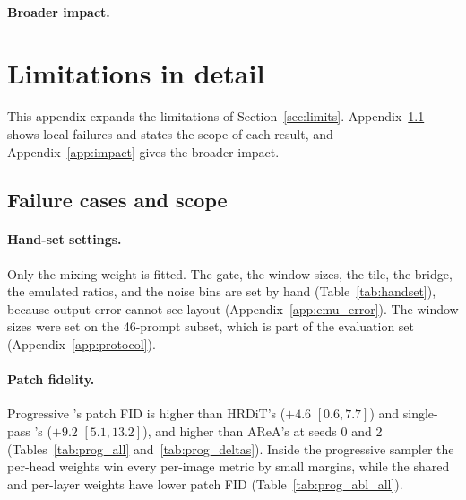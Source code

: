 \paragraph{Broader impact.} \apximpacttext

\else
\apxbarrier
\section{Limitations in detail}
\label{app:limits}

This appendix expands the limitations of Section~\ref{sec:limits}. Appendix~\ref{app:failures} shows local failures and states the scope of each result, and Appendix~\ref{app:impact} gives the broader impact.

\subsection{Failure cases and scope}
\label{app:failures}



\paragraph{Hand-set settings.} Only the mixing weight is fitted. The gate, the window sizes, the tile, the bridge, the emulated ratios, and the noise bins are set by hand (Table~\ref{tab:handset}), because output error cannot see layout (Appendix~\ref{app:emu_error}). The window sizes were set on the 46-prompt subset, which is part of the evaluation set (Appendix~\ref{app:protocol}).

\paragraph{Patch fidelity.} Progressive \sca{}'s patch FID is higher than HRDiT's ($+4.6$ $[0.6,7.7]$) and single-pass \sca{}'s ($+9.2$ $[5.1,13.2]$), and higher than AReA's at seeds 0 and 2 (Tables~\ref{tab:prog_all} and~\ref{tab:prog_deltas}).\ifresprogabl{} Inside the progressive sampler the per-head weights win every per-image metric by small margins, while the shared and per-layer weights have lower patch FID (Table~\ref{tab:prog_abl_all}).\fi

